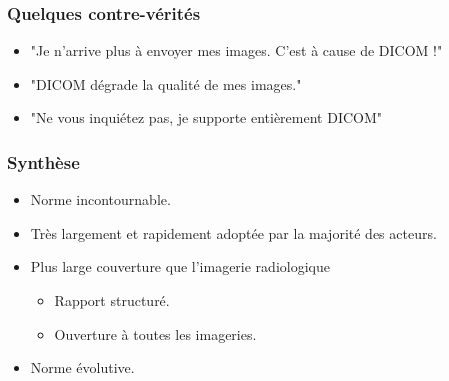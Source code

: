 \frame
{
	\frametitle{Quelques contre-v\'erit\'es}
	\begin{itemize}
		\item "Je n'arrive plus \`a envoyer mes images. C'est \`a cause de DICOM !"
		\item<3-> "DICOM d\'egrade la qualit\'e de mes images."
		\item<5-> "Ne vous inqui\'etez pas, je supporte enti\`erement DICOM"
	\end{itemize}
}

\frame
{
	\frametitle{Synth\`ese}
	\begin{itemize}
		\item<1-> Norme incontournable.
		\item<2-> Tr\`es largement et rapidement adopt\'ee par la majorit\'e des acteurs.
		\item<3-> Plus large couverture que l'imagerie radiologique
		\begin{itemize}
			\item<4-> Rapport structur\'e.
			\item<5-> Ouverture \`a toutes les imageries.
		\end{itemize}
		\item<6-> Norme \'evolutive.
	\end{itemize}
}
